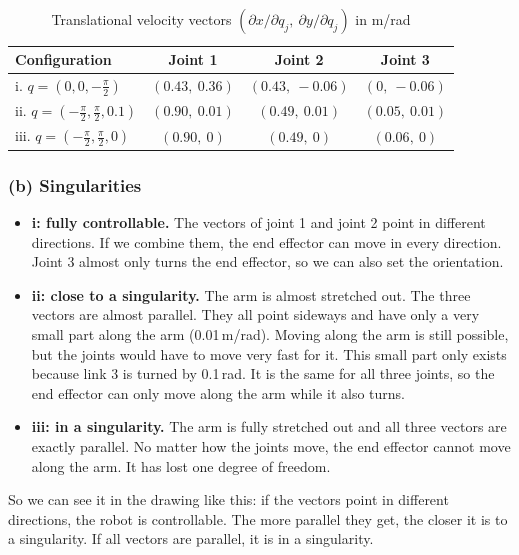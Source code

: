 \documentclass[11pt, a4paper]{article}
\begin{document}
\begin{table}[H]
  \centering
  \caption{Translational velocity vectors $(\partial x / \partial q_j,\ \partial y / \partial q_j)$ in m/rad}
  \begin{tabular}{l c c c}
    \toprule
    Configuration & Joint 1 & Joint 2 & Joint 3 \\
    \midrule
    i. $q = (0, 0, -\frac{\pi}{2})$ & $(0.43,\ 0.36)$ & $(0.43,\ -0.06)$ & $(0,\ -0.06)$ \\
    ii. $q = (-\frac{\pi}{2}, \frac{\pi}{2}, 0.1)$ & $(0.90,\ 0.01)$ & $(0.49,\ 0.01)$ & $(0.05,\ 0.01)$ \\
    iii. $q = (-\frac{\pi}{2}, \frac{\pi}{2}, 0)$ & $(0.90,\ 0)$ & $(0.49,\ 0)$ & $(0.06,\ 0)$ \\
    \bottomrule
  \end{tabular}
\end{table}

\subsubsection*{(b) Singularities}

\begin{itemize}
  \item \textbf{i: fully controllable.} The vectors of joint 1 and joint 2 point in different
        directions. If we combine them, the end effector can move in every direction. Joint 3 almost
        only turns the end effector, so we can also set the orientation.
  \item \textbf{ii: close to a singularity.} The arm is almost stretched out. The three vectors are
        almost parallel. They all point sideways and have only a very small part along the arm
        (0.01\,m/rad). Moving along the arm is still possible, but the joints would have to move very
        fast for it. This small part only exists because link 3 is turned by 0.1\,rad. It is the same
        for all three joints, so the end effector can only move along the arm while it also turns.
  \item \textbf{iii: in a singularity.} The arm is fully stretched out and all three vectors are
        exactly parallel. No matter how the joints move, the end effector cannot move along the arm.
        It has lost one degree of freedom.
\end{itemize}

So we can see it in the drawing like this: if the vectors point in different directions, the robot is
controllable. The more parallel they get, the closer it is to a singularity. If all vectors are
parallel, it is in a singularity.
\end{document}
